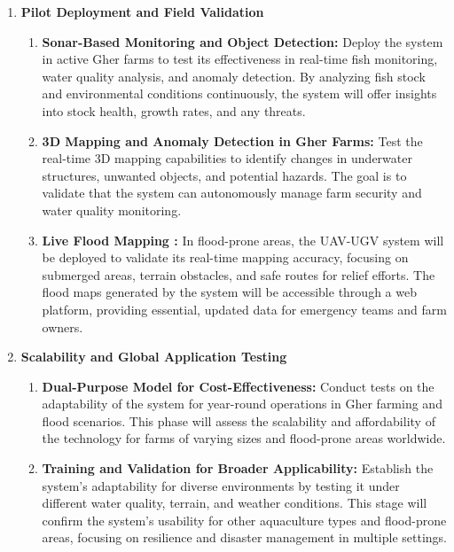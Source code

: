 \documentclass[conference]{IEEEtran}
\begin{document}
\begin{enumerate}
	\item \textbf{Pilot Deployment and Field Validation}
		\begin{enumerate}
			\item \textbf{Sonar-Based Monitoring and Object Detection: }Deploy the system in active Gher farms to test its effectiveness in real-time fish monitoring, water quality analysis, and anomaly detection. By analyzing fish stock and environmental conditions continuously, the system will offer insights into stock health, growth rates, and any threats.
			\item \textbf{3D Mapping and Anomaly Detection in Gher Farms: }Test the real-time 3D mapping capabilities to identify changes in underwater structures, unwanted objects, and potential hazards. The goal is to validate that the system can autonomously manage farm security and water quality monitoring.
			\item \textbf{Live Flood Mapping :}
			In flood-prone areas, the UAV-UGV system will be deployed to validate its real-time mapping accuracy, focusing on submerged areas, terrain obstacles, and safe routes for relief efforts. The flood maps generated by the system will be accessible through a web platform, providing essential, updated data for emergency teams and farm owners.	
		\end{enumerate}

	\item \textbf{Scalability and Global Application Testing}
		\begin{enumerate}
			\item \textbf{Dual-Purpose Model for Cost-Effectiveness: } Conduct tests on the adaptability of the system for year-round operations in Gher farming and flood scenarios. This phase will assess the scalability and affordability of the technology for farms of varying sizes and flood-prone areas worldwide.
			\item \textbf{Training and Validation for Broader Applicability: }
			Establish the system’s adaptability for diverse environments by testing it under different water quality, terrain, and weather conditions. This stage will confirm the system’s usability for other aquaculture types and flood-prone areas, focusing on resilience and disaster management in multiple settings.
		\end{enumerate}
\end{enumerate}
	
\end{document}

